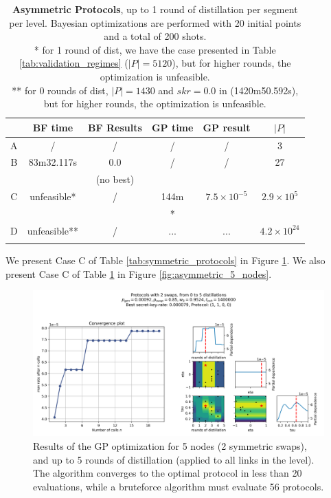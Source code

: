 \documentclass{article}
\begin{document}
\begin{table}[ht!]
    \centering
    \begin{tabular}{|c|c|c|c|c|c|}
        \hline
        & BF time & BF Results & GP time & GP result & $|P|$ \\
        \hline
        \hline
        A & / & / & / & / & 3 \\
        \hline
        B & 83m32.117s & 0.0 & / & / & 27 \\
          & & (no best) & & & \\
        \hline
        C & unfeasible* & / & 144m & $7.5 \times 10^{-5}$ & $2.9 \times 10^{5}$ \\
          & & & *\footnotemark[2] & & \\
        \hline
        D & unfeasible** & / & ... & ... & $4.2 \times 10^{24}$ \\
          & & & & & \\
        \hline
    \end{tabular}
    \caption{\textbf{Asymmetric Protocols}, up to 1 round of distillation per segment per level. 
    Bayesian optimizations are performed with 20 initial points and a total of 200 shots. \\ * for 1 round of dist, we have the case presented in Table \ref{tab:validation_regimes} ($|P| = 5120$), but for higher rounds, the optimization is unfeasible. \\ ** for 0 rounds of dist, $|P| = 1430$ and $skr=0.0$ in (1420m50.592s), but for higher rounds, the optimization is unfeasible.}
    \label{tab:asymmetric_protocols}
\end{table}


We present Case C of Table \ref{tab:symmetric_protocols} in Figure \ref{fig:symmetric_5_nodes}. We also present Case C of Table \ref{tab:asymmetric_protocols} in Figure \ref{fig:asymmetric_5_nodes}.

\begin{figure}[ht!]
  \centering
  \includegraphics[width=\linewidth]{symmetric/results_gp_centerspace/0.9524_2_swaps_skopt_gp.png}  
  \caption{Results of the GP optimization for 5 nodes (2 symmetric swaps), and up to 5 rounds of distillation (applied to all links in the level). The algorithm converges to the optimal protocol in less than 20 evaluations, while a bruteforce algorithm must evaluate 56 protocols.}
  \label{fig:symmetric_5_nodes}
\end{figure}
\end{document}
